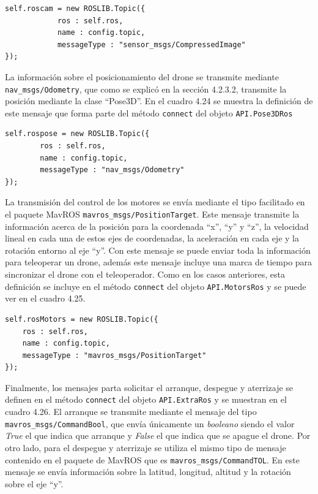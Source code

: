 \begin{lstlisting}[caption= Definición del mensaje para la información de las cámaras, label=cod.mensajecamdrone]
self.roscam = new ROSLIB.Topic({
            ros : self.ros,
            name : config.topic,
            messageType : "sensor_msgs/CompressedImage"
});
\end{lstlisting}

La información sobre el posicionamiento del drone se transmite mediante \texttt{nav\_msgs/Odometry}, que como se explicó en la sección 4.2.3.2, transmite la posición mediante la clase ``Pose3D''. En el cuadro 4.24 se muestra la definición de este mensaje que forma parte del método \texttt{connect} del objeto \texttt{API.Pose3DRos}

\begin{lstlisting}[caption= Definición del mensaje para obtener el posicionamiento del drone, label=cod.mensajeposedrone]
self.rospose = new ROSLIB.Topic({
		ros : self.ros,
		name : config.topic,
		messageType : "nav_msgs/Odometry"
});
\end{lstlisting}

La transmisión del control de los motores se envía mediante el tipo facilitado en el paquete MavROS \texttt{mavros\_msgs/PositionTarget}. Este mensaje transmite la información acerca de la posición para la coordenada ``x'', ``y'' y ``z'', la velocidad lineal en cada una de estos ejes de coordenadas, la aceleración en cada eje y la rotación entorno al eje ``y''. Con este mensaje se puede enviar toda la información para teleoperar un drone, además este mensaje incluye una marca de tiempo para sincronizar el drone con el teleoperador. Como en los casos anteriores, esta definición se incluye en el método \texttt{connect} del objeto \texttt{API.MotorsRos} y se puede ver en el cuadro 4.25.

\begin{lstlisting}[caption= Definición del mensaje para controlar los motores del drone, label=cod.mensajemotordrone]
self.rosMotors = new ROSLIB.Topic({
	ros : self.ros,
	name : config.topic,
	messageType : "mavros_msgs/PositionTarget"
});
\end{lstlisting}

Finalmente, los mensajes parta solicitar el arranque, despegue y aterrizaje se definen en el método \texttt{connect} del objeto \texttt{API.ExtraRos} y se muestran en el cuadro 4.26. El arranque se transmite mediante el mensaje del tipo \texttt{mavros\_msgs/CommandBool}, que envía únicamente un \textit{booleano} siendo el valor \textit{True} el que indica que arranque y \textit{False} el que indica que se apague el drone. Por otro lado, para el despegue y aterrizaje se utiliza el mismo tipo de mensaje contenido en el paquete de MavROS que es \texttt{mavros\_msgs/CommandTOL}. En este mensaje se envía información sobre la latitud, longitud, altitud y la rotación sobre el eje ``y''.

